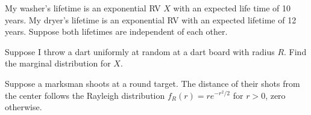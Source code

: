 \documentclass[addpoints,12pt]{exam}
\begin{document}
\begin{questions}
\addpoints

\question[4] My washer's lifetime is an exponential RV $X$ with an expected life time of 10 years. My dryer's lifetime is an exponential RV with an expected lifetime of 12 years. Suppose both lifetimes are independent of each other.
\noaddpoints
{}
\addpoints


\question[2] Suppose I throw a dart uniformly at random at a dart board with radius $R$. Find the marginal distribution for $X$.
\vspace{2in}

\question[4] Suppose a marksman shoots at a round target. The distance of their shots from the center follows the Rayleigh distribution $f_R(r)=r e^{-r^2/2}$ for $r>0$, zero otherwise.
\noaddpoints
{}
\end{questions}
\end{document}
